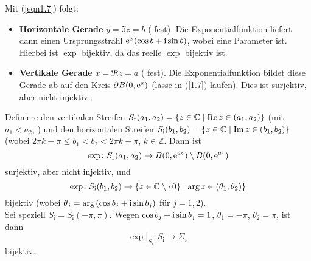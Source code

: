 \documentclass[a4paper,twoside,DIV15,BCOR12mm]{scrbook}
\begin{document}
Mit (\ref{eqn1.7}) folgt:

\begin{itemize}
\item {\bf Horizontale Gerade} $y=\Im{z}=b$ ( fest). Die Exponentialfunktion liefert dann einen Ursprungsstrahl
  $\mathrm{e}^x(\cos{b}+\mathrm{i}\sin{b})$, wobei  eine Parameter ist. Hierbei ist $\exp$ bijektiv, da das reelle $\exp$ bijektiv
  ist.
\item {\bf Vertikale Gerade} $x=\Re{z}=a$ ( fest). Die Exponentialfunktion bildet diese Gerade ab auf den Kreis
  $\partial B(0,\mathrm{e}^a)$ (lasse in (\ref{1.7})  laufen). Dies ist surjektiv, aber nicht injektiv.
\end{itemize}

\noindent Definiere den vertikalen Streifen $S_\text{r}(a_1,a_2) = \{z\in\mathbb{C} \mid \operatorname{Re}{z}\in(a_1,a_2)\}$ (mit $a_1<a_2$,
) und den horizontalen Streifen $S_\text{i}(b_1,b_2) = \{z\in\mathbb{C} \mid \operatorname{Im}{z}\in(b_1,b_2)\}$ (wobei $2\pi k-\pi
\leq b_1<b_2 < 2\pi k + \pi$, $k\in\mathbb{Z}$. Dann ist
\[\exp\colon S_\text{r}(a_1,a_2) \to B(0,\mathrm{e}^{a_2})\setminus B(0,\mathrm{e}^{a_1})\]
surjektiv, aber nicht injektiv, und
\[\exp\colon S_\text{i}(b_1,b_2) \to \{z\in\mathbb{C}\setminus\{0\} \mid \arg{z}\in(\theta_1,\theta_2)\}\]
bijektiv (wobei $\theta_j = \arg{(\cos{b_j}+\mathrm{i}\sin{b_j})}$ für $j=1,2$).\\
Sei speziell $S_\text{i}=S_\text{i}(-\pi,\pi)$. Wegen $\cos{b_j}+\mathrm{i}\sin{b_j}=1$, $\theta_1=-\pi$, $\theta_2=\pi$, ist dann
\[\exp|_{S_\text{i}}\colon S_\text{i} \to \Sigma_\pi\] bijektiv.
\end{document}
